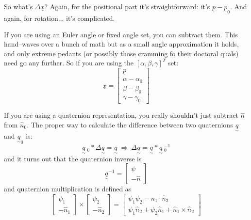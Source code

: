 \documentclass[]{article}
\begin{document}
So what's $\Delta \underline{x}$? Again, for the positional part it's straightforward: it's $\underline{p}-\underline{p}_{0}$. And again, for rotation... it's complicated.

If you are using an Euler angle or fixed angle set, you can subtract them. This hand--waves over a bunch of math but as a small angle approximation it holds, and only extreme pedants (or possibly those cramming fo their doctoral quals) need go any further. So if you are using the $\left[\alpha, \beta, \gamma\right]^{T}$ set:
\begin{displaymath}
\underline{x} = \left[ \begin{array}{c} \underline{p} \\ \alpha-\alpha_{0} \\ \beta-\beta_{0} \\ \gamma-\gamma_{0} \end{array}\right]
\end{displaymath}

If you are using a quaternion representation, you really shouldn't just subtract $\hat{n}$ from $\hat{n}_{0}$. The proper way to calculate the difference between two quaternions $\underset{\sim}{q}$ and $\underset{\sim}{q}_{0}$ is:
\begin{displaymath}
\underset{\sim}{q}\ \!\!_{0} * \Delta {\underset{\sim}{q}} = \underset{\sim}{q}\ \Rightarrow\ \Delta {\underset{\sim}{q}} = \underset{\sim}{q} * \underset{\sim}{q}\ \!\!_{0}^{-1}
\end{displaymath}
and it turns out that the quaternion inverse is
\begin{displaymath}
{\underset{\sim}{q}}^{-1} = \left[\begin{array}{c} \psi \\ - \hat{n} \end{array}\right]
\end{displaymath}
and quaternion multiplication is defined as
\begin{displaymath}
	\left[\begin{array}{c} \psi_{1} \\ - \hat{n}_{1} \end{array}\right] \times \left[\begin{array}{c} \psi_{2} \\ - \hat{n}_{2} \end{array}\right] = \left[\begin{array}{c} \psi_{1}\psi_{2} - \hat{n}_{1}\cdot\hat{n}_{2} \\ \psi_{1}\hat{n}_{2} + \psi_{2}\hat{n}_{1} + \hat{n}_{1} \times \hat{n}_{2} \end{array}\right]
\end{displaymath}
\end{document}
